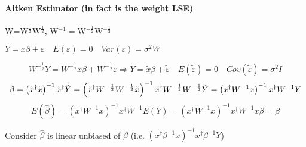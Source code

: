 \documentclass{article}
\begin{document}
\paragraph{Aitken Estimator (in fact is the weight LSE)}

\quad

\bigskip

W=W$^{\frac{1}{2}}$W$^{\frac{1}{2}}$, W$^{-1}=$W$^{-\frac{1}{2}}$W$^{-\frac{1%
}{2}}$

$Y=x\beta +\varepsilon \quad E\left( \varepsilon \right) =0\quad Var\left(
\varepsilon \right) =\sigma ^{2}W$

\begin{equation*}
W^{-\frac{1}{2}}Y=W^{-\frac{1}{2}}x\beta +W^{-\frac{1}{2}}\varepsilon
\Rightarrow \tilde{Y}=\tilde{x}\beta +\tilde{\varepsilon}\quad E\left( 
\tilde{\varepsilon}\right) =0\quad Cov\left( \tilde{\varepsilon}\right)
=\sigma ^{2}I
\end{equation*}%
\begin{equation*}
\hat{\beta}=\left( \tilde{x}^{\dagger }\tilde{x}\right) ^{-1}\tilde{x}%
^{\dagger }\tilde{Y}=\left( \tilde{x}^{\dagger }W^{-\frac{1}{2}}W^{-\frac{1}{%
2}}\tilde{x}\right) ^{-1}\tilde{x}^{\dagger }W^{-\frac{1}{2}}W^{-\frac{1}{2}}%
\tilde{Y}=\left( x^{\dagger }W^{-1}x\right) ^{-1}x^{\dagger }W^{-1}Y
\end{equation*}%
\begin{equation*}
E\left( \hat{\beta}\right) =\left( x^{\dagger }W^{-1}x\right)
^{-1}x^{\dagger }W^{-1}E\left( Y\right) =\left( x^{\dagger }W^{-1}x\right)
^{-1}x^{\dagger }W^{-1}x\beta =\beta
\end{equation*}

Consider $\hat{\beta}$ is linear unbiased of $\beta $ (i.e. $\left(
x^{\dagger }\beta ^{-1}x\right) ^{-1}x^{\dagger }\beta ^{-1}Y$)
\end{document}
